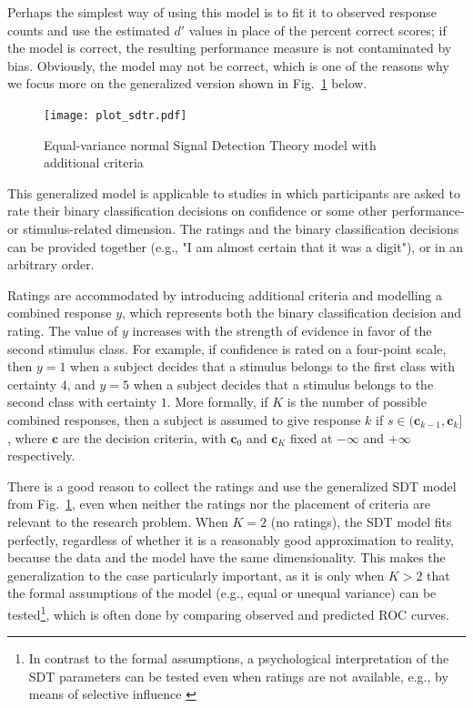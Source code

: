 \documentclass[a4paper,man,apacite,floatsintext]{apa6}
\begin{document}
Perhaps the simplest way of using this model is to fit it to observed
response counts and use the estimated $d'$ values in place of the
percent correct scores; if the model is correct, the resulting
performance measure is not contaminated by bias. Obviously, the model
may not be correct, which is one of the reasons why we focus more on
the generalized version shown in Fig.~\ref{sdtr} below.


\begin{figure}[H]
  \centering
  \texttt{[image: plot\_sdtr.pdf]}
  \caption{Equal-variance normal Signal Detection Theory model with
    additional criteria}
  \label{sdtr}
\end{figure}

This generalized model is applicable to studies in which participants
are asked to rate their binary classification decisions on confidence
or some other performance- or stimulus-related dimension. The ratings
and the binary classification decisions can be provided together
(e.g., "I am almost certain that it was a digit"), or in an arbitrary
order.

Ratings are accommodated by introducing additional criteria and
modelling a combined response $y$, which represents both the binary
classification decision and rating. The value of $y$ increases with
the strength of evidence in favor of the second stimulus class. For
example, if confidence is rated on a four-point scale, then $y = 1$
when a subject decides that a stimulus belongs to the first class with
certainty $4$, and $y = 5$ when a subject decides that a stimulus
belongs to the second class with certainty $1$. More formally, if $K$
is the number of possible combined responses, then a subject is
assumed to give response $k$ if $s \in (\bm{c}_{k-1},\bm{c}_k]$, where
$\bm{c}$ are the decision criteria, with $\bm{c}_0$ and $\bm{c}_K$
fixed at $-\infty$ and $+\infty$ respectively.

There is a good reason to collect the ratings and use the generalized
SDT model from Fig.~\ref{sdtr}, even when neither the ratings nor the
placement of criteria are relevant to the research problem. When
$K = 2$ (no ratings), the SDT model fits perfectly, regardless of
whether it is a reasonably good approximation to reality, because the
data and the model have the same dimensionality. This makes the
generalization to the case particularly important, as it is only when
$K > 2$ that the formal assumptions of the model (e.g., equal or
unequal variance) can be tested\footnote{In contrast to the formal
  assumptions, a psychological interpretation of the SDT parameters
  can be tested even when ratings are not available, e.g., by means of
  selective influence \cite{sternberg2001separate}}, which is often
done by comparing observed and predicted ROC curves.
\end{document}
